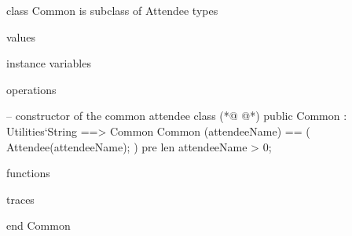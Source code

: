 \begin{vdmpp}[breaklines=true]
class Common is subclass of Attendee
types

values

instance variables

operations

 -- constructor of the common attendee class 
(*@
\label{Common:11}
@*)
 public Common : Utilities`String ==> Common
     Common (attendeeName) == (
      Attendee(attendeeName); 
     )
     pre len attendeeName > 0;

functions

traces

end Common
\end{vdmpp}

